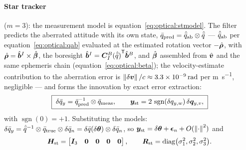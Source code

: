 \paragraph{Star tracker} ($m = 3$): the measurement model is
equation~\eqref{eq:optical:stmodel}. The filter predicts the aberrated
attitude with its own state, $\bar{q}_{\mathrm{pred}} =
\hat{\bar{q}}_{\mathrm{ab}} \otimes \hat{\bar{q}}$ ---
$\hat{\bar{q}}_{\mathrm{ab}}$ per equation~\eqref{eq:optical:qab}
evaluated at the estimated rotation vector $-\hat{\bm{\rho}}$, with
$\hat{\bm{\rho}} = \hat{\bm{b}}^{I} \times \hat{\bm{\beta}}$, the
boresight $\hat{\bm{b}}^{I} =
{\bm{C}_{I}^{B}(\hat{\bar{q}})}^{\mathsf T}\hat{\bm{b}}^{B}$, and
$\hat{\bm{\beta}}$ assembled from
$\hat{\bm{v}}$ and the same ephemeris chain
(equation~\eqref{eq:optical:beta}); the velocity-estimate contribution
to the aberration error is $\left\lVert \delta\bm{v} \right\rVert/c \approx
\qty{3.3e-9}{\radian}$ per \unit{\metre\per\second}, negligible ---
and forms the innovation by exact error extraction:
\begin{equation}
  \boxed{\;
  \delta\bar{q}_y = \bar{q}_{\mathrm{pred}}^{-1} \otimes
    \bar{q}_{\mathrm{meas}},
  \qquad
  \bm{y}_{\mathrm{st}} = 2\,\operatorname{sgn}(\delta q_{y,w})\,
    \delta\bm{q}_{y,v},
  \;}
  \label{eq:ekf:stinnov}
\end{equation}
with $\operatorname{sgn}(0) = +1$. Substituting the models:
$\delta\bar{q}_y = \hat{\bar{q}}^{-1} \otimes \bar{q}_{\mathrm{true}}
\otimes \delta\bar{q}_n = \delta\bar{q}(\delta\bm{\theta}) \otimes
\delta\bar{q}_n$, so $\bm{y}_{\mathrm{st}} = \delta\bm{\theta} +
\bm{\epsilon}_n + O(\left\lVert \cdot \right\rVert^2)$ and
\begin{equation}
  \bm{H}_{\mathrm{st}} =
  \begin{bmatrix}
    \bm{I}_3 & \bm{0} & \bm{0} & \bm{0} & \bm{0}
  \end{bmatrix},
  \qquad
  \bm{R}_{\mathrm{st}} = \mathrm{diag}\bigl(\sigma_1^2, \sigma_2^2,
    \sigma_3^2\bigr).
  \label{eq:ekf:stH}
\end{equation}

